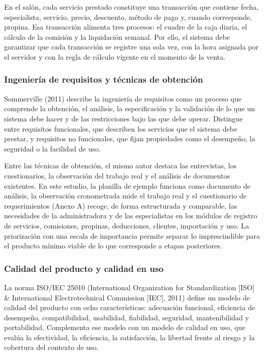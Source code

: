 En el salón, cada servicio prestado constituye una transacción que contiene fecha, especialista, servicio, precio, descuento, método de pago y, cuando corresponde, propina. Esa transacción alimenta tres procesos: el cuadre de la caja diaria, el cálculo de la comisión y la liquidación semanal. Por ello, el sistema debe garantizar que cada transacción se registre una sola vez, con la hora asignada por el servidor y con la regla de cálculo vigente en el momento de la venta.


\subsubsection{Ingeniería de requisitos y técnicas de obtención}

Sommerville (2011) describe la ingeniería de requisitos como un proceso que comprende la obtención, el análisis, la especificación y la validación de lo que un sistema debe hacer y de las restricciones bajo las que debe operar. Distingue entre requisitos funcionales, que describen los servicios que el sistema debe prestar, y requisitos no funcionales, que fijan propiedades como el desempeño, la seguridad o la facilidad de uso.


Entre las técnicas de obtención, el mismo autor destaca las entrevistas, los cuestionarios, la observación del trabajo real y el análisis de documentos existentes. En este estudio, la planilla de ejemplo funciona como documento de análisis, la observación cronometrada mide el trabajo real y el cuestionario de requerimientos (Anexo A) recoge, de forma estructurada y comparable, las necesidades de la administradora y de las especialistas en los módulos de registro de servicios, comisiones, propinas, deducciones, clientes, importación y uso. La priorización con una escala de importancia permite separar lo imprescindible para el producto mínimo viable de lo que corresponde a etapas posteriores.


\subsubsection{Calidad del producto y calidad en uso}

La norma ISO/IEC 25010 (International Organization for Standardization [ISO] \& International Electrotechnical Commission [IEC], 2011) define un modelo de calidad del producto con ocho características: adecuación funcional, eficiencia de desempeño, compatibilidad, usabilidad, fiabilidad, seguridad, mantenibilidad y portabilidad. Complementa ese modelo con un modelo de calidad en uso, que evalúa la efectividad, la eficiencia, la satisfacción, la libertad frente al riesgo y la cobertura del contexto de uso.


